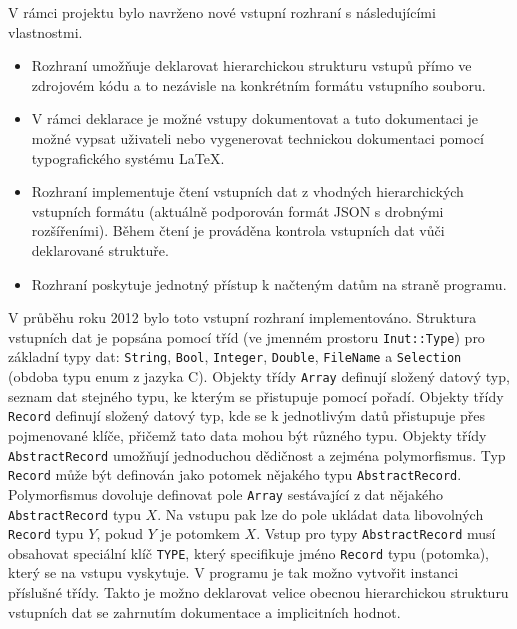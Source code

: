\documentclass[11pt]{report}
\begin{document}
V rámci projektu bylo navrženo nové vstupní rozhraní s následujícími 
vlastnostmi.
\begin{itemize}
\item Rozhraní umožňuje deklarovat hierarchickou strukturu vstupů 
přímo ve zdrojovém kódu a to nezávisle na konkrétním formátu vstupního souboru.
%
\item V rámci deklarace je možné vstupy dokumentovat a tuto dokumentaci je 
možné vypsat uživateli nebo vygenerovat technickou dokumentaci pomocí 
typografického systému \LaTeX.
%
\item Rozhraní implementuje čtení vstupních dat z 
vhodných hierarchických vstupních formátu (aktuálně podporován formát JSON s 
drobnými rozšířeními). Během čtení je prováděna kontrola vstupních dat vůči 
deklarované struktuře.
%
\item Rozhraní poskytuje jednotný přístup k načteným datům na straně programu. 
\end{itemize}

V průběhu roku 2012 bylo toto vstupní rozhraní implementováno. Struktura 
vstupních dat je popsána pomocí tříd (ve jmenném prostoru \verb'Inut::Type') 
pro základní typy dat: \verb'String', \verb'Bool', \verb'Integer', 
\verb'Double', \verb'FileName' a \verb'Selection' (obdoba typu enum z jazyka 
C). Objekty třídy \verb'Array' definují složený datový typ, seznam dat 
stejného typu, ke kterým se přistupuje pomocí pořadí. Objekty třídy 
\verb'Record' definují složený datový typ, kde se k jednotlivým datů přistupuje 
přes pojmenované klíče, přičemž tato data mohou být různého typu. Objekty třídy 
\verb'AbstractRecord' umožňují jednoduchou dědičnost a zejména polymorfismus. 
Typ \verb'Record' může být definován jako potomek nějakého typu 
\verb'AbstractRecord'. Polymorfismus dovoluje definovat pole 
\verb'Array' sestávající z dat nějakého \verb'AbstractRecord' typu $X$.
Na vstupu pak lze do pole ukládat data libovolných 
\verb'Record' typu $Y$, pokud $Y$ je potomkem $X$. Vstup pro typy 
\verb'AbstractRecord' musí obsahovat speciální klíč \verb'TYPE', který 
specifikuje jméno \verb'Record' typu (potomka), který se na vstupu vyskytuje. 
V programu je tak možno vytvořit instanci příslušné třídy.
Takto je možno deklarovat velice obecnou hierarchickou strukturu vstupních dat 
se zahrnutím dokumentace a implicitních hodnot.
\end{document}
